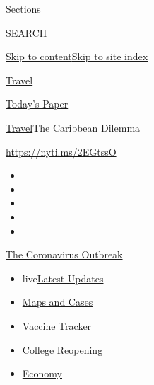 Sections

SEARCH

\protect\hyperlink{site-content}{Skip to
content}\protect\hyperlink{site-index}{Skip to site index}

\href{https://www.nytimes3xbfgragh.onion/section/travel}{Travel}

\href{https://myaccount.nytimes3xbfgragh.onion/auth/login?response_type=cookie\&client_id=vi}{}

\href{https://www.nytimes3xbfgragh.onion/section/todayspaper}{Today's
Paper}

\href{/section/travel}{Travel}\textbar{}The Caribbean Dilemma

\url{https://nyti.ms/2EGtssO}

\begin{itemize}
\item
\item
\item
\item
\item
\end{itemize}

\href{https://www.nytimes3xbfgragh.onion/news-event/coronavirus?action=click\&pgtype=Article\&state=default\&region=TOP_BANNER\&context=storylines_menu}{The
Coronavirus Outbreak}

\begin{itemize}
\tightlist
\item
  live\href{https://www.nytimes3xbfgragh.onion/2020/08/04/world/coronavirus-covid-19.html?action=click\&pgtype=Article\&state=default\&region=TOP_BANNER\&context=storylines_menu}{Latest
  Updates}
\item
  \href{https://www.nytimes3xbfgragh.onion/interactive/2020/us/coronavirus-us-cases.html?action=click\&pgtype=Article\&state=default\&region=TOP_BANNER\&context=storylines_menu}{Maps
  and Cases}
\item
  \href{https://www.nytimes3xbfgragh.onion/interactive/2020/science/coronavirus-vaccine-tracker.html?action=click\&pgtype=Article\&state=default\&region=TOP_BANNER\&context=storylines_menu}{Vaccine
  Tracker}
\item
  \href{https://www.nytimes3xbfgragh.onion/2020/08/02/us/covid-college-reopening.html?action=click\&pgtype=Article\&state=default\&region=TOP_BANNER\&context=storylines_menu}{College
  Reopening}
\item
  \href{https://www.nytimes3xbfgragh.onion/live/2020/08/03/business/stock-market-today-coronavirus?action=click\&pgtype=Article\&state=default\&region=TOP_BANNER\&context=storylines_menu}{Economy}
\end{itemize}

